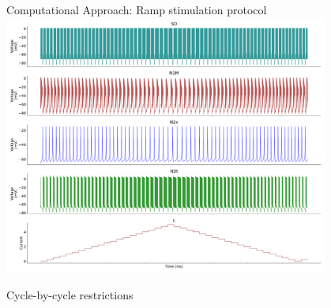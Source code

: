 \documentclass[aspectratio=43]{beamer}
\begin{document}
\begin{frame}{Computational Approach: Ramp stimulation protocol}
	\centering
	\includegraphics[width=0.8\textwidth]{methods-paper-modelo/circuit_w_current.pdf}
\end{frame}

\begin{frame}{Cycle-by-cycle restrictions}
\end{frame}
\end{document}
